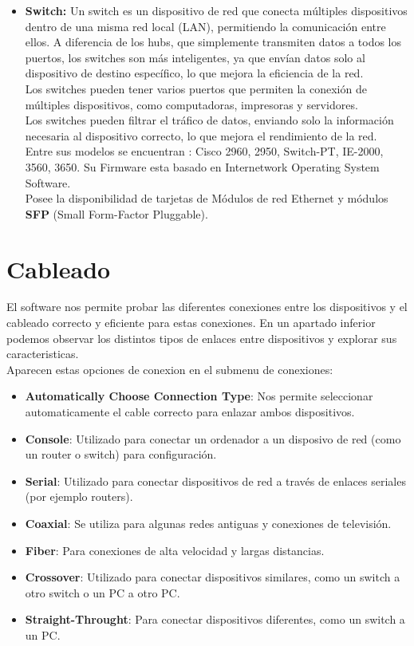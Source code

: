 \documentclass{article}
\begin{document}
\begin{itemize}
        \item \textbf{Switch:} Un switch es un dispositivo de red que conecta múltiples dispositivos dentro de una misma red local (LAN), permitiendo la comunicación entre ellos. A diferencia de los hubs, que simplemente transmiten datos a todos los puertos, los switches son más inteligentes, ya que envían datos solo al dispositivo de destino específico, lo que mejora la eficiencia de la red. \\Los switches pueden tener varios puertos que permiten la conexión de múltiples dispositivos, como computadoras, impresoras y servidores. \\ Los switches pueden filtrar el tráfico de datos, enviando solo la información necesaria al dispositivo correcto, lo que mejora el rendimiento de la red. \\ Entre sus modelos se encuentran : Cisco 2960, 2950, Switch-PT, IE-2000, 3560, 3650. Su Firmware esta basado en Internetwork Operating System Software.\\ Posee la disponibilidad de tarjetas de Módulos de red Ethernet y módulos \textbf{SFP} (Small Form-Factor Pluggable).

        
    \end{itemize}

\section{Cableado}
 El software nos permite probar las diferentes conexiones entre los dispositivos y el cableado correcto y eficiente  para estas conexiones. En un apartado inferior podemos observar los distintos tipos de enlaces entre dispositivos y explorar sus caracteristicas. 
 \\
 Aparecen estas opciones de conexion en el submenu de conexiones: 
 \begin{itemize}
     \item \textbf{Automatically Choose Connection Type}: Nos permite seleccionar automaticamente el cable correcto para enlazar ambos dispositivos.  
     \item \textbf{Console}: Utilizado para conectar un ordenador a un disposivo de red (como un router o switch) para configuración.
     \item \textbf{Serial}: Utilizado para conectar dispositivos de red a través de enlaces seriales (por ejemplo routers).
     \item \textbf{Coaxial}: Se utiliza para algunas redes antiguas y conexiones de televisión.
     \item \textbf{Fiber}: Para conexiones de alta velocidad y largas distancias.
     \item \textbf{Crossover}: Utilizado para conectar dispositivos similares, como un switch a otro switch o un PC a otro PC.
     \item \textbf{Straight-Throught}: Para conectar dispositivos diferentes, como un switch a un PC.
 \end{itemize}
\end{document}
